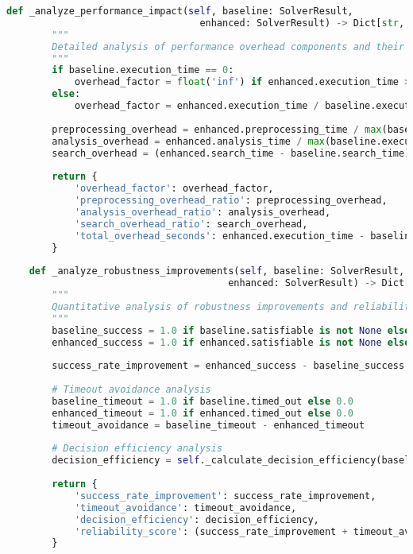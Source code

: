 \begin{lstlisting}[language=Python, caption=Trade-off Monitoring and Analysis Framework]
    def _analyze_performance_impact(self, baseline: SolverResult, 
                                  enhanced: SolverResult) -> Dict[str, float]:
        """
        Detailed analysis of performance overhead components and their contributions.
        """
        if baseline.execution_time == 0:
            overhead_factor = float('inf') if enhanced.execution_time > 0 else 1.0
        else:
            overhead_factor = enhanced.execution_time / baseline.execution_time
        
        preprocessing_overhead = enhanced.preprocessing_time / max(baseline.execution_time, 0.001)
        analysis_overhead = enhanced.analysis_time / max(baseline.execution_time, 0.001)
        search_overhead = (enhanced.search_time - baseline.search_time) / max(baseline.execution_time, 0.001)
        
        return {
            'overhead_factor': overhead_factor,
            'preprocessing_overhead_ratio': preprocessing_overhead,
            'analysis_overhead_ratio': analysis_overhead,
            'search_overhead_ratio': search_overhead,
            'total_overhead_seconds': enhanced.execution_time - baseline.execution_time
        }
    
    def _analyze_robustness_improvements(self, baseline: SolverResult, 
                                       enhanced: SolverResult) -> Dict[str, float]:
        """
        Quantitative analysis of robustness improvements and reliability enhancements.
        """
        baseline_success = 1.0 if baseline.satisfiable is not None else 0.0
        enhanced_success = 1.0 if enhanced.satisfiable is not None else 0.0
        
        success_rate_improvement = enhanced_success - baseline_success
        
        # Timeout avoidance analysis
        baseline_timeout = 1.0 if baseline.timed_out else 0.0
        enhanced_timeout = 1.0 if enhanced.timed_out else 0.0
        timeout_avoidance = baseline_timeout - enhanced_timeout
        
        # Decision efficiency analysis
        decision_efficiency = self._calculate_decision_efficiency(baseline, enhanced)
        
        return {
            'success_rate_improvement': success_rate_improvement,
            'timeout_avoidance': timeout_avoidance,
            'decision_efficiency': decision_efficiency,
            'reliability_score': (success_rate_improvement + timeout_avoidance) / 2.0
        }
    

\end{lstlisting}
